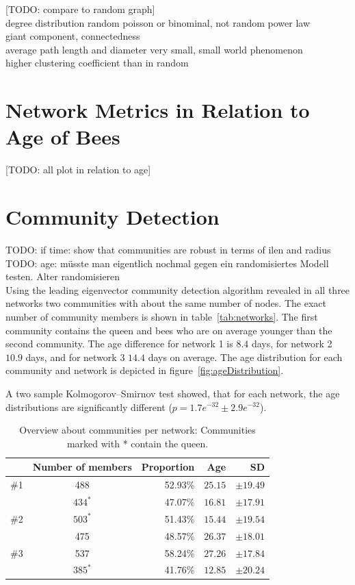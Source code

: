 [TODO: compare to random graph]\\
degree distribution random poisson or binominal, not random power law\\
giant component, connectedness\\
average path length and diameter very small, small world phenomenon\\
higher clustering coefficient than in random\\

\section{Network Metrics in Relation to Age of Bees}

[TODO: all plot in relation to age]

\section{Community Detection}

TODO: if time: show that communities are robust in terms of ilen and radius\\
TODO: age: müsste man eigentlich nochmal gegen ein randomisiertes Modell testen. Alter randomisieren\\

Using the leading eigenvector community detection algorithm revealed in all three networks two communities with about the same number of nodes. The exact number of community members is shown in table~\ref{tab:networks}. The first community contains the queen and bees who are on average younger than the second community. The age difference for network 1 is $8.4$ days, for network 2 $10.9$ days, and for network 3 $14.4$ days on average. The age distribution for each community and network is depicted in figure~\ref{fig:ageDistribution}.

A two sample Kolmogorov–Smirnov test showed, that for each network, the age distributions are significantly different ($p=1.7e^{-32} \pm2.9e^{-32}$).

\begin{table}
\centering
\begin{tabular}{ccrrr}
	\toprule
	{}  & Number of members & Proportion & Age & SD\\
	\midrule 
	\#1  & 488     & 52.93\% & $25.15$ & $\pm19.49$ \\
	             & $434^*$ & 47.07\% & $16.81$ & $\pm17.91$ \\
	\midrule   							
	\#2  & $503^*$ & 51.43\% & $15.44$ & $\pm19.54$ \\
	             & 475     & 48.57\% & $26.37$ & $\pm18.01$ \\
	\midrule  
	\#3  & 537     & 58.24\% & $27.26$ & $\pm17.84$ \\
	             & $385^*$ & 41.76\% & $12.85$ & $\pm20.24$ \\
	\bottomrule
\end{tabular}
\caption[Overview about communities]{Overview about communities per network: Communities marked with * contain the queen.}
\label{tab:communities}
\end{table}

